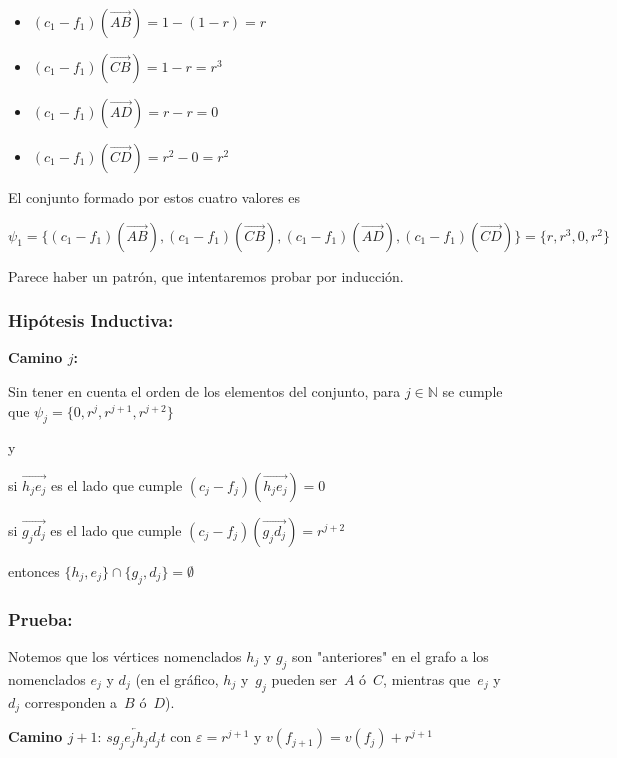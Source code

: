 \documentclass[10pt,a4paper]{article}
\begin{document}
\begin{itemize}

	\item $(c_1 - f_1) (\overrightarrow{AB}) = 1 - (1-r) = r$
	\item $(c_1 - f_1) (\overrightarrow{CB}) = 1- r = r^3$
	\item $(c_1 - f_1) (\overrightarrow{AD}) = r - r=0$
	\item $(c_1 - f_1) (\overrightarrow{CD}) = r^2 - 0 = r^2$
\end{itemize}

El conjunto formado por estos cuatro valores es

\begin{center}
$\psi_1 = \{(c_1-f_1)(\overrightarrow{AB}), (c_1-f_1)(\overrightarrow{CB}), (c_1-f_1)(\overrightarrow{AD}), (c_1-f_1)(\overrightarrow{CD})\} = \{r, r^3, 0, r^2\}$
\end{center}

Parece haber un patrón, que intentaremos probar por inducción.

\subsubsection*{\textbf{Hipótesis Inductiva:}}

\textbf{Camino $j$:}

Sin tener en cuenta el orden de los elementos del conjunto, para $j \in \mathbb{N}$ se cumple que $\psi_j= \{0, r^j, r^{j+1}, r^{j+2}\}$

y

si $\overrightarrow{h_je_j}$ es el lado que cumple $(c_j-f_j)(\overrightarrow{h_je_j}) = 0$

si $\overrightarrow{g_jd_j}$ es el lado que cumple $(c_j-f_j)(\overrightarrow{g_jd_j}) = r^{j+2}$

entonces $\{h_j, e_j\}\cap \{g_j, d_j\} = \emptyset$

\subsubsection*{\textbf{Prueba:}}

Notemos que los vértices nomenclados $h_j$ y $g_j$ son "anteriores" en el grafo a los nomenclados $e_j$ y $d_j$ (en el gráfico, $h_j$ y $g_j$ pueden ser $A$ ó $C$, mientras que $e_j$ y $d_j$ corresponden a $B$ ó $D$).

\textbf{Camino $j+1$}: $sg_j\overleftarrow{e_jh_j}d_jt$ con $\varepsilon = r^{j+1}$ y $v(f_{j+1}) = v(f_j)+r^{j+1}$
\end{document}
